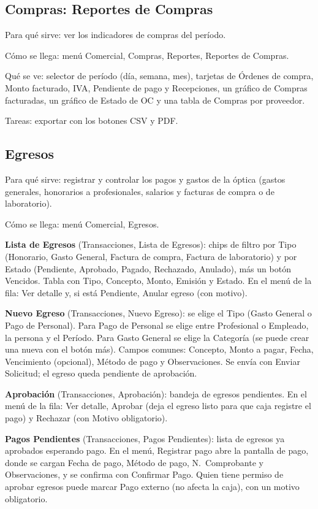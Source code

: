 \subsection{Compras: Reportes de Compras}
\label{sec:mu-compras-reportes}

Para qué sirve: ver los indicadores de compras del período.

Cómo se llega: menú Comercial, Compras, Reportes, Reportes de Compras.

Qué se ve: selector de período (día, semana, mes), tarjetas de Órdenes de compra, Monto facturado, IVA, Pendiente de pago y Recepciones, un gráfico de Compras facturadas, un gráfico de Estado de OC y una tabla de Compras por proveedor.

Tareas: exportar con los botones CSV y PDF.

\subsection{Egresos}
\label{sec:mu-egresos}

Para qué sirve: registrar y controlar los pagos y gastos de la óptica (gastos generales, honorarios a profesionales, salarios y facturas de compra o de laboratorio).

Cómo se llega: menú Comercial, Egresos.

\textbf{Lista de Egresos} (Transacciones, Lista de Egresos): chips de filtro por Tipo (Honorario, Gasto General, Factura de compra, Factura de laboratorio) y por Estado (Pendiente, Aprobado, Pagado, Rechazado, Anulado), más un botón Vencidos. Tabla con Tipo, Concepto, Monto, Emisión y Estado. En el menú de la fila: Ver detalle y, si está Pendiente, Anular egreso (con motivo).

\textbf{Nuevo Egreso} (Transacciones, Nuevo Egreso): se elige el Tipo (Gasto General o Pago de Personal). Para Pago de Personal se elige entre Profesional o Empleado, la persona y el Período. Para Gasto General se elige la Categoría (se puede crear una nueva con el botón más). Campos comunes: Concepto, Monto a pagar, Fecha, Vencimiento (opcional), Método de pago y Observaciones. Se envía con Enviar Solicitud; el egreso queda pendiente de aprobación.

\textbf{Aprobación} (Transacciones, Aprobación): bandeja de egresos pendientes. En el menú de la fila: Ver detalle, Aprobar (deja el egreso listo para que caja registre el pago) y Rechazar (con Motivo obligatorio).

\textbf{Pagos Pendientes} (Transacciones, Pagos Pendientes): lista de egresos ya aprobados esperando pago. En el menú, Registrar pago abre la pantalla de pago, donde se cargan Fecha de pago, Método de pago, N.\ Comprobante y Observaciones, y se confirma con Confirmar Pago. Quien tiene permiso de aprobar egresos puede marcar Pago externo (no afecta la caja), con un motivo obligatorio.

